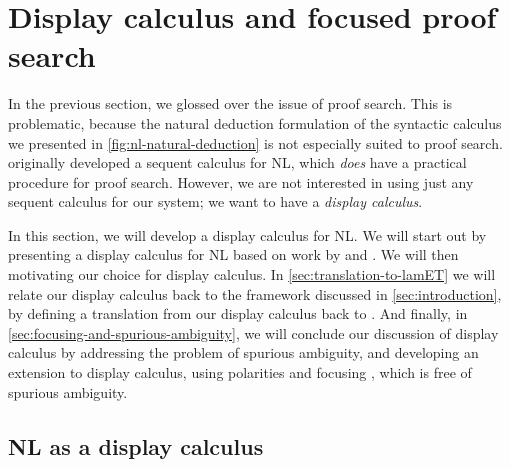 \section{Display calculus and focused proof search}
\label{sec:display-calculus}

In the previous section, we glossed over the issue of proof
search. This is problematic, because the natural deduction formulation
of the syntactic calculus we presented in
\autoref{fig:nl-natural-deduction} is not especially suited to proof
search. \citeauthor{lambek1961} originally developed a sequent
calculus for NL, which \emph{does} have a practical procedure
for proof search. However, we are not interested in using just any
sequent calculus for our system; we want to have a \emph{display
  calculus}.

In this section, we will develop a display calculus
\citep{belnap1982} for NL. We will start out by presenting a display
calculus for NL based on work by \citet{moortgat2009,moortgat2012} and
\citet{gore1998}. We will then motivating our choice for display
calculus.
In \autoref{sec:translation-to-lamET} we will relate our display
calculus back to the framework discussed in \autoref{sec:introduction},
by defining a translation from our display calculus back to \lamET.
And finally, in \autoref{sec:focusing-and-spurious-ambiguity}, we will
conclude our discussion of display calculus by addressing the problem
of spurious ambiguity, and developing an extension to display
calculus, using polarities and focusing
\citep{girard1991,bastenhof2011}, which is free of spurious
ambiguity.



\subsection{NL as a display calculus}
\label{sec:nl-as-a-display-calculus}


